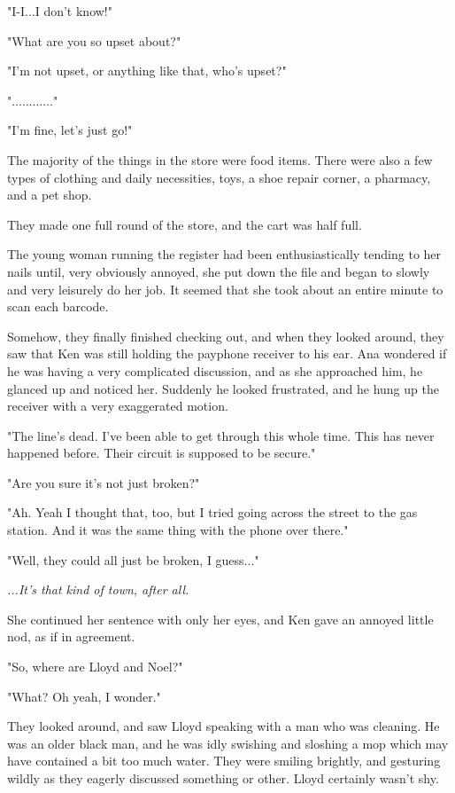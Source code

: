 \documentclass[
]{article}
\begin{document}
"I-I...I don't know!"

"What are you so upset about?"

"I'm not upset, or anything like that, who's upset?"

"............"

"I'm fine, let's just go!"

The majority of the things in the store were food items. There were also
a few types of clothing and daily necessities, toys, a shoe repair
corner, a pharmacy, and a pet shop.

They made one full round of the store, and the cart was half full.

The young woman running the register had been enthusiastically tending
to her nails until, very obviously annoyed, she put down the file and
began to slowly and very leisurely do her job. It seemed that she took
about an entire minute to scan each barcode.

Somehow, they finally finished checking out, and when they looked
around, they saw that Ken was still holding the payphone receiver to his
ear. Ana wondered if he was having a very complicated discussion, and as
she approached him, he glanced up and noticed her. Suddenly he looked
frustrated, and he hung up the receiver with a very exaggerated motion.

"The line's dead. I've been able to get through this whole time. This
has never happened before. Their circuit is supposed to be secure."

"Are you sure it's not just broken?"

"Ah. Yeah I thought that, too, but I tried going across the street to
the gas station. And it was the same thing with the phone over there."

"Well, they could all just be broken, I guess..."

\emph{...It's that kind of town, after all.}

She continued her sentence with only her eyes, and Ken gave an annoyed
little nod, as if in agreement.

"So, where are Lloyd and Noel?"

"What? Oh yeah, I wonder."

They looked around, and saw Lloyd speaking with a man who was cleaning.
He was an older black man, and he was idly swishing and sloshing a mop
which may have contained a bit too much water. They were smiling
brightly, and gesturing wildly as they eagerly discussed something or
other. Lloyd certainly wasn't shy.
\end{document}
